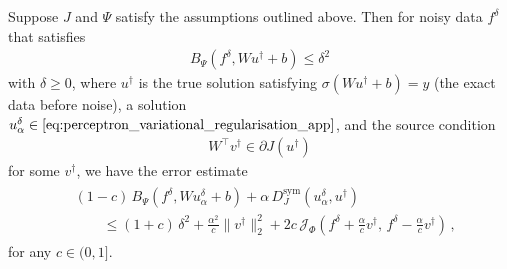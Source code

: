 \begin{thm}\label{thm:perceptron_error_estimate_app}
Suppose $J$ and $\Psi$ satisfy the assumptions outlined above. Then for noisy data $f^\delta$ that satisfies 
\begin{align*}
    B_\Psi(f^\delta, Wu^\dagger+b) \leq \delta^2
\end{align*}
with $\delta \geq 0$, where $u^\dagger$ is the true solution satisfying $\sigma(Wu^\dagger+b) = y$ (the exact data before noise), a solution $u_\alpha^\delta \in \eqref{eq:perceptron_variational_regularisation_app}$, and the source condition
\begin{align}\label{eq:source_condition_app}
    W^\top v^\dagger \in \partial J(u^\dagger)
\end{align}
for some $v^\dagger$, we have the error estimate
\begin{align}
    \begin{split}
    &(1-c)\,B_\Psi\!\left(f^\delta, Wu_\alpha^\delta+b\right) + \alpha\,D_J^{\mathrm{sym}}(u_\alpha^\delta,u^\dagger) \\
    &\qquad\le (1+c)\,\delta^2 + \frac{\alpha^2}{c}\|v^\dagger\|_2^2 + 2c\,\mathcal{J}_{\Phi}\!\left(f^\delta+\frac{\alpha}{c}v^\dagger,\,f^\delta-\frac{\alpha}{c}v^\dagger\right) \, ,
    \end{split}
    \label{eq:perceptron_error_estimate_app}
\end{align}
for any $c\in(0,1]$.
\end{thm}

